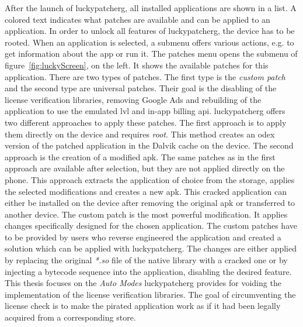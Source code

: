 After the launch of \gls{luckypatcherg}, all installed applications are shown in a list.
A colored text indicates what patches are available and can be applied to an application.
In order to unlock all features of \gls{luckypatcherg}, the device has to be rooted.
\newline
When an application is selected, a submenu offers various actions, e.g. to get information about the app or run it.
The patches menu opens the submenu of figure~\ref{fig:luckyScreen}, on the left.
It shows the available patches for this application.
\newline
There are two types of patches.
The first type is the \textit{custom patch} and the second type are universal patches.
Their goal is the disabling of the license verification libraries, removing Google Ads and rebuilding of the application to use the emulated \gls{lvl} and in-app billing \gls{api}.
\newline
\gls{luckypatcherg} offers two different approaches to apply these patches.
The first approach is to apply them directly on the device and requires \textit{root}.
This method creates an \gls{odex} version of the patched application in the Dalvik cache on the device.
The second approach is the creation of a modified \gls{apk}.
The same patches as in the first approach are available after selection, but they are not applied directly on the phone.
This approach extracts the application of choice from the storage, applies the selected modifications and creates a new \gls{apk}.
This cracked application can either be installed on the device after removing the original \gls{apk} or transferred to another device.
\newline
The custom patch is the most powerful modification.
It applies changes specifically designed for the chosen application.
The custom patches have to be provided by users who reverse engineered the application and created a solution which can be applied with \gls{luckypatcherg}.
The changes are either applied by replacing the original \textit{*.so} file of the native library with a cracked one or by injecting a bytecode sequence into the application, disabling the desired feature.
\newline
\newline
This thesis focuses on the \textit{Auto Modes} \gls{luckypatcherg} provides for voiding the implementation of the license verification libraries.
The goal of circumventing the license check is to make the pirated application work as if it had been legally acquired from a corresponding store.
